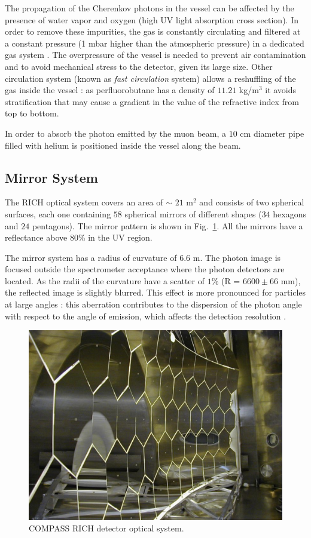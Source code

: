 The propagation of the Cherenkov photons in the vessel can be affected by the presence of water vapor and oxygen (high UV light absorption cross section). In order to remove these impurities, the gas is constantly circulating and filtered at a constant pressure (1 mbar higher than the atmospheric pressure) in a dedicated gas system \cite{RICHGas}. The overpressure of the vessel is needed to prevent air contamination and to avoid mechanical stress to the detector, given its large size. Other circulation system (known as \textit{fast circulation} system) allows a reshuffling of the gas inside the vessel : as perfluorobutane has a density of $11.21$ kg/m$^3$ it avoids stratification that may cause a gradient in the value of the refractive index from top to bottom.

In order to absorb the photon emitted by the muon beam, a $10$ cm diameter pipe filled with helium is positioned inside the vessel along the beam.

\subsection{Mirror System}

The RICH optical system covers an area of $\sim$ $21$ m$^2$ and consists of two spherical surfaces, each one containing $58$ spherical mirrors of different shapes ($34$ hexagons and $24$ pentagons). The mirror pattern is shown in Fig.~\ref{pic:RICHmirrors}. All the mirrors have a reflectance above $80$\% in the UV region.

The mirror system has a radius of curvature of $6.6$ m. The photon image is focused outside the spectrometer acceptance where the photon detectors are located. As the radii of the curvature have a scatter of $1$\% (R = $6600\pm66$ mm), the reflected image is slightly blurred. This effect is more pronounced for particles at large angles \cite{RICHMirror} : this aberration contributes to the dispersion of the photon angle with respect to the angle of emission, which affects the detection resolution \cite{RICHPID}.

\begin{figure}[!h]
  \centering
	\includegraphics[scale=0.4]{./gfx/RICHmirrors.png}
	\caption{COMPASS RICH detector optical system.}
	\label{pic:RICHmirrors}
\end{figure}

